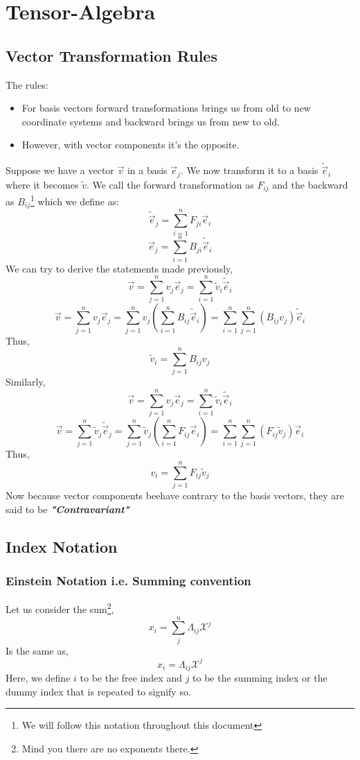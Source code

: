 \chapter{Tensor-Algebra}
\section{Vector Transformation Rules}
The rules:
\begin{itemize}
	\item For basis vectors forward transformations brings us from old to new coordinate systems and backward brings us from new to old.
	\item However, with vector components it's the opposite.\\
\end{itemize}

Suppose we have a vector $\vec{v}$ in a basis $\vec{e}_j$. We now transform it to a basis $\tilde{\vec{e}}_i$ where it becomes $\tilde{v}$. We call the forward transformation as $F_{ij}$ and the backward as $B_{ij}$\footnote{We will follow this notation throughout this document} which we define as:
$$\tilde{\vec{e}}_j = \sum_{i = 1}^{n} F_{ji} \vec{e}_i$$
$$\vec{e}_j = \sum_{i = 1}^{n} B_{ji} \tilde{\vec{e}}_i$$
We can try to derive the statements made previously,
$$\vec{v} = \sum_{j = 1}^{n} v_{j}\vec{e}_j = \sum_{i = 1}^{n} \tilde{v}_{i}\tilde{\vec{e}}_i$$
$$\vec{v} = \sum_{j = 1}^{n} v_{j}\vec{e}_j = \sum_{j = 1}^{n} {v}_{j}(\sum_{i=1}^{n} B_{ij} \tilde{\vec{e}}_i) =  \sum_{i = 1}^{n} \sum_{j = 1}^{n} (B_{ij} {v}_{j}) \tilde{\vec{e}}_i$$
Thus,
\begin{equation}
\tilde{v}_i = \sum_{j = 1}^{n} B_{ij} {v}_{j}
\end{equation}
Similarly,
$$\vec{v} = \sum_{j = 1}^{n} v_{j}\vec{e}_j = \sum_{i = 1}^{n} \tilde{v}_{i}\tilde{\vec{e}}_i$$
$$\vec{v} = \sum_{j = 1}^{n} \tilde{v}_{j}\tilde{\vec{e}}_j = \sum_{j = 1}^{n} \tilde{v}_{j}(\sum_{i = 1}^{n} F_{ij} \vec{e}_i) =  \sum_{i = 1}^{n} \sum_{j = 1}^{n} (F_{ij} \tilde{v}_{j}) {\vec{e}}_i$$
Thus,
\begin{equation}
{v}_i = \sum_{j = 1}^{n} F_{ij} \tilde{v}_{j}
\end{equation}
Now because vector components beehave contrary to the basis vectors, they are said to be \textit{\textbf{"Contravariant"}}
\section{Index Notation}
\subsection{Einstein Notation i.e. Summing convention}
Let us consider the sum\footnote{Mind you there are no exponents there.},
$$x_{i} = \sum_{j}^{n}\Lambda_{ij}\mathcal{X}^{j}$$
Is the same as,
$$x_{i} = \Lambda_{ij}\mathcal{X}^{j}$$ 
Here, we define $i$ to be the free index and $j$ to be the summing index or the dummy index that is repeated to signify so.

